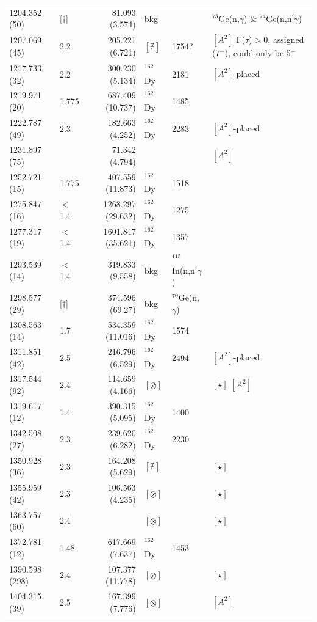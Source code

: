\begin{landscape}
\begin{center}
\begin{longtable}{p{2.6cm}|p{1.2cm}|r|p{1.1cm}|p{2.0cm}|l}
  1204.352 (50)  & [$\dagger$]  &  81.093 (3.574)& bkg &  & $^{73}$Ge(n,$\gamma$) \& $^{74}$Ge(n,n$^\prime\gamma$) \\
  1207.069 (45)  & 2.2        & 205.221 (6.721)& $[\nexists]$ & 1754? &$[A^2]$ F($\tau$)$>$0, assigned (7$^-$), could only be 5$^-$\\
  1217.733 (32)  & 2.2        &300.230 (5.134)& $^{162}$Dy & 2181 &$[A^2]$-placed\\
  1219.971 (20)  & 1.775      &687.409 (10.737)& $^{162}$Dy & 1485 & \\
  1222.787 (49)  & 2.3        &182.663 (4.252)& $^{162}$Dy & 2283 &$[A^2]$-placed \\
  1231.897 (75)  &            &71.342 (4.794)& & & $[A^2]$\\
  1252.721 (15)  & 1.775      &407.559 (11.873)& $^{162}$Dy & 1518 & \\
  1275.847 (16)  & $<$1.4     &1268.297 (29.632)& $^{162}$Dy& 1275 & \\
  1277.317 (19)  & $<$1.4     &1601.847 (35.621)& $^{162}$Dy & 1357 & \\
  1293.539 (14)  & $<$1.4     & 319.833 (9.558)& bkg & $^{115}$In(n,n$^\prime\gamma$) &  \\
  1298.577 (29)  & [$\dagger$]& 374.596 (69.27)& bkg  & $^{70}$Ge(n,$\gamma$) &  \\
  1308.563 (14)  & 1.7        &534.359 (11.016)& $^{162}$Dy & 1574 & \\
  1311.851 (42)  & 2.5        &216.796 (6.529)& $^{162}$Dy & 2494 &$[A^2]$-placed \\
  1317.544 (92)  & 2.4        &114.659 (4.166)& $[\otimes]$ & &$[\star]$ $[A^2]$ \\
  1319.617 (12)  & 1.4        &390.315 (5.095)& $^{162}$Dy & 1400 & \\
  1342.508 (27)  & 2.3        &239.620 (6.282)& $^{162}$Dy & 2230 & \\
  1350.928 (36)  & 2.3        &164.208 (5.629)& $[\nexists]$ & &$[\star]$ \\
  1355.959 (42)  & 2.3        &106.563 (4.235)& $[\otimes]$ & &$[\star]$ \\
  1363.757 (60)  & 2.4        && $[\otimes]$ & &$[\star]$ \\
  1372.781 (12)  & 1.48       &617.669 (7.637)& $^{162}$Dy & 1453 & \\
  1390.598 (298) & 2.4        &107.377 (11.778)& $[\otimes]$ & &$[\star]$ \\
  1404.315 (39)  & 2.5        &167.399  (7.776)& $[\otimes]$ & & $[A^2]$\\

\end{longtable}
\end{center}
\end{landscape}
